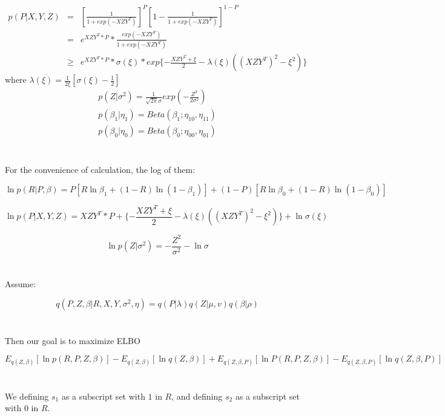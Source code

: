 \documentclass[11pt]{report}
\begin{document}
\begin{eqnarray*}
    p(P|X,Y,Z)&=&[\frac{1}{1+exp(-XZY^{T})}]^{P}[1-\frac{1}{1+exp(-XZY^{T})}]^{1-P} \\
    &=& e^{XZY^{T}*P}*\frac{exp(-XZY^{T})}{1+exp(-XZY^{T})}\\
    &\geq& e^{XZY^{T}*P}*\sigma(\xi)*exp\{-\frac{XZY^{T}+\xi}{2}-\lambda(\xi)((XZY^{T})^2-\xi^2)\}
\end{eqnarray*}
where $\lambda(\xi)=\frac{1}{2\xi}[\sigma(\xi)-\frac{1}{2}]$
\begin{eqnarray*}
    p(Z|\sigma^2)=\frac{1}{\sqrt{2\pi}\sigma}exp(-\frac{Z^2}{2\sigma^2})\\
    p(\beta_1|\eta_1)=Beta(\beta_1;\eta_{10},\eta_{11})\\
    p(\beta_0|\eta_0)=Beta(\beta_0;\eta_{00},\eta_{01})
\end{eqnarray*}
\\
\\
For the convenience of calculation, the log of them:

\begin{equation}
    \ln p(R|P,\beta)=P[R\ln\beta_{1}+(1-R)\ln (1-\beta_{1})]+(1-P)[R\ln\beta_{0}+(1-R)\ln(1-\beta_{0})]
\end{equation}

\begin{equation}
    \ln p(P|X,Y,Z)= XZY^{T} * P + \{-\frac{XZY^{T}+\xi}{2}-\lambda(\xi)((XZY^{T})^2-\xi^2)\}
    +\ln \sigma(\xi)
\end{equation}

\begin{equation}
    \ln p(Z|\sigma^{2})=-\frac{Z^2}{\sigma^2}-\ln\sigma
\end{equation}
\\
\\
Assume:

\begin{equation}
    q(P,Z,\beta|R,X,Y,\sigma^{2},\eta) = q(P|\lambda)q(Z|\mu,v)q(\beta|\rho)
\end{equation}
\\
\\
Then our goal is to maximize ELBO

\begin{equation}
    E_{q(Z,\beta)}[\ln p(R,P,Z,\beta)] -E_{q(Z,\beta)}[\ln q(Z,\beta)] + E_{q(Z,\beta ,P)}[\ln P(R,P,Z,\beta)] -E_{q(Z,\beta,P)}[\ln q(Z,\beta,P)]
\end{equation}
\\
\\
We defining $s_1$ as a subscript set with $1$ in $R$, and defining $s_2$ as a subscript set with $0$ in $R$.
\end{document}
